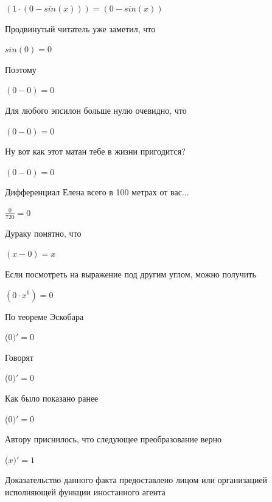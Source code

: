\documentclass[12pt,a4paper,fleqn]{article}
\begin{document}
\begin{center}
\begin{center}
\begin{center}
\begin{center}
\begin{center}
\begin{center}
\begin{center}
\begin{center}
\begin{center}
\begin{center}
\begin{center}
\begin{center}
\begin{center}
\begin{center}
\begin{center}
\begin{center}
\begin{center}
\begin{center}
$(1 \cdot (0-sin(x))) = (0-sin(x))$\end{center}
Продвинутый читатель уже заметил, что

\begin{center}
\begin{center}$sin(0) = 0$\end{center}
Поэтому

\begin{center}
\begin{center}$(0-0) = 0$\end{center}
Для любого эпсилон больше нулю очевидно, что

\begin{center}
\begin{center}$(0-0) = 0$\end{center}
Ну вот как этот матан тебе в жизни пригодится?

\begin{center}
\begin{center}$(0-0) = 0$\end{center}
Дифференциал Елена всего в 100 метрах от вас...

\begin{center}
\begin{center}$\frac{0}{720} = 0$\end{center}
Дураку понятно, что

\begin{center}
$(x-0) = x$\end{center}
Если посмотреть на выражение под другим углом, можно получить

\begin{center}
$(0 \cdot x^{6}) = 0$\end{center}
По теореме Эскобара

\begin{center}
 ($0)'
  = 0$\end{center}
Говорят

\begin{center}
 ($0)'
  = 0$\end{center}
Как было показано ранее

\begin{center}
 ($0)'
  = 0$\end{center}
Автору приснилось, что следующее преобразование верно

\begin{center}
 ($x)'
  = 1$\end{center}
Доказательство данного факта предоставлено лицом или организацией исполняющей функции иностанного агента


\end{center}
\end{center}
\end{center}
\end{center}
\end{center}
\end{center}
\end{center}
\end{center}
\end{center}
\end{center}
\end{center}
\end{center}
\end{center}
\end{center}
\end{center}
\end{center}
\end{center}
\end{center}
\end{center}
\end{center}
\end{center}
\end{center}
\end{document}

